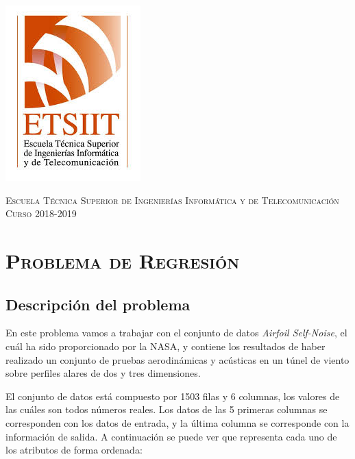 \documentclass[11pt,a4paper]{article}
\begin{document}
\begin{titlepage}
\begin{minipage}{\textwidth}
\includegraphics[scale=0.3]{img/etsiit.jpeg}

\vspace{0.7cm}
\textsc{Escuela Técnica Superior de Ingenierías Informática y de Telecomunicación}\\
\vspace{1cm}
\textsc{Curso 2018-2019}
\end{minipage}
\end{titlepage}

\tableofcontents
\thispagestyle{empty}				%

\newpage

\setlength{\parskip}{1em}

\section{\textsc{Problema de Regresión}}

\subsection{Descripción del problema}

En este problema vamos a trabajar con el conjunto de datos \textit{Airfoil Self-Noise}\cite{airfoil}, el cuál ha sido proporcionado
por la NASA, y contiene los resultados de haber realizado un conjunto de pruebas aerodinámicas y acústicas en un túnel de viento sobre
perfiles alares de dos y tres dimensiones.

El conjunto de datos está compuesto por 1503 filas y 6 columnas, los valores de las cuáles son todos números reales. Los datos de
las 5 primeras columnas se corresponden con los datos de entrada, y la última columna se corresponde con la información de salida.
A continuación se puede ver que representa cada uno de los atributos de forma ordenada:
\end{document}
